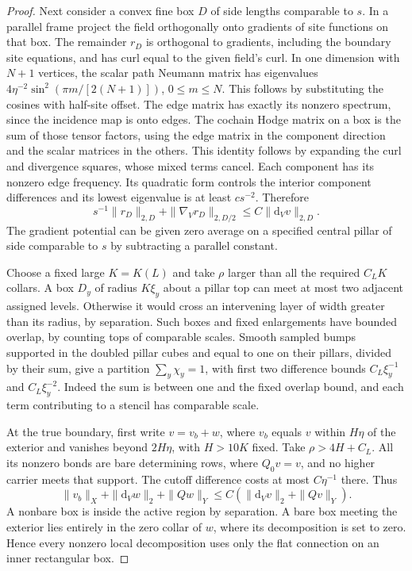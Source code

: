 \documentclass[11pt,letterpaper,reqno]{amsart}
\numberwithin{equation}{section}
\theoremstyle{definition}
\theoremstyle{remark}
\begin{document}
\begin{proof}
Next consider a convex fine box \(D\) of side lengths
comparable to \(s\). In a parallel frame project the field
orthogonally onto gradients of site functions on that box.
The remainder \(r_D\) is orthogonal to gradients, including
the boundary site equations, and has curl equal to the
given field's curl. In one dimension with \(N+1\) vertices,
the scalar path Neumann matrix has eigenvalues
\(4\eta^{-2}\sin^2(\pi m/[2(N+1)])\), \(0\le m\le N\).
This follows by substituting the cosines with half-site
offset. The edge matrix has exactly its nonzero spectrum,
since the incidence map is onto edges. The cochain Hodge
matrix on a box is the sum of those tensor factors, using
the edge matrix in the component direction and the scalar
matrices in the others. This identity follows by expanding
the curl and divergence squares, whose mixed terms cancel.
Each component has its nonzero edge frequency. Its
quadratic form controls the interior component differences
and its lowest eigenvalue is at least \(cs^{-2}\).
Therefore
\begin{equation}\label{mb:eq-local-hodge}
       s^{-1}\|r_D\|_{2,D}+\|\nabla_Vr_D\|_{2,D/2}
                            \le C\|\mathrm d_Vv\|_{2,D}.
\end{equation}
The gradient potential can be given zero average on a
specified central pillar of side comparable to \(s\) by
subtracting a parallel constant.

Choose a fixed large \(K=K(L)\) and take \(\rho\) larger
than all the required \(C_LK\) collars. A box \(D_y\) of
radius \(K\xi_y\) about a pillar top can meet at most two
adjacent assigned levels. Otherwise it would cross an
intervening layer of width greater than its radius, by
separation. Such boxes and fixed enlargements have bounded
overlap, by counting tops of comparable scales. Smooth
sampled bumps supported in the doubled pillar cubes and
equal to one on their pillars, divided by their sum, give
a partition \(\sum_y\chi_y=1\), with first two difference
bounds \(C_L\xi_y^{-1}\) and \(C_L\xi_y^{-2}\). Indeed the
sum is between one and the fixed overlap bound, and each
term contributing to a stencil has comparable scale.

At the true boundary, first write \(v=v_b+w\), where
\(v_b\) equals \(v\) within \(H\eta\) of the exterior and
vanishes beyond \(2H\eta\), with \(H>10K\) fixed.
Take \(\rho>4H+C_L\). All its nonzero bonds are bare
determining rows, where \(Q_0v=v\), and no higher carrier
meets that support. The cutoff difference costs at most
\(C\eta^{-1}\) there. Thus
\[
 \|v_b\|_X+\|\mathrm d_Vw\|_2+\|Qw\|_Y
                           \le C(\|\mathrm d_Vv\|_2+\|Qv\|_Y).
\]
A nonbare box is inside the active region by separation.
A bare box meeting the exterior lies entirely in the
zero collar of \(w\), where its decomposition is set to
zero. Hence every nonzero local decomposition uses only
the flat connection on an inner rectangular box.


\end{proof}
\end{document}
